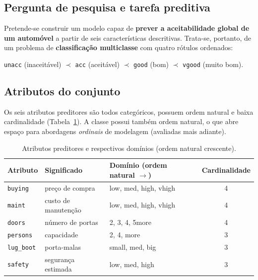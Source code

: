 \documentclass[11pt,a4paper]{article}
\newcommand{\code}[1]{\texttt{\small #1}}
\begin{document}
\subsection{Pergunta de pesquisa e tarefa preditiva}
Pretende-se construir um modelo capaz de \textbf{prever a aceitabilidade global de um automóvel} a partir de seis características descritivas. Trata-se, portanto, de um problema de \textbf{classificação multiclasse} com quatro rótulos ordenados:
\begin{center}
\code{unacc} (inaceitável) $\prec$ \code{acc} (aceitável) $\prec$ \code{good} (bom) $\prec$ \code{vgood} (muito bom).
\end{center}

\subsection{Atributos do conjunto}
Os seis atributos preditores são todos categóricos, possuem ordem natural e baixa cardinalidade (Tabela~\ref{tab:atributos}). A classe possui também ordem natural, o que abre espaço para abordagens \emph{ordinais} de modelagem (avaliadas mais adiante).

\begin{table}[H]
\centering
\caption{Atributos preditores e respectivos domínios (ordem natural crescente).}
\label{tab:atributos}
\small
\begin{tabular}{lll c}
\toprule
\textbf{Atributo} & \textbf{Significado} & \textbf{Domínio (ordem natural $\rightarrow$)} & \textbf{Cardinalidade} \\
\midrule
\code{buying}    & preço de compra      & low, med, high, vhigh   & 4 \\
\code{maint}     & custo de manutenção  & low, med, high, vhigh   & 4 \\
\code{doors}     & número de portas     & 2, 3, 4, 5more          & 4 \\
\code{persons}   & capacidade           & 2, 4, more              & 3 \\
\code{lug\_boot} & porta-malas          & small, med, big         & 3 \\
\code{safety}    & segurança estimada   & low, med, high          & 3 \\
\bottomrule
\end{tabular}
\end{table}
\end{document}
